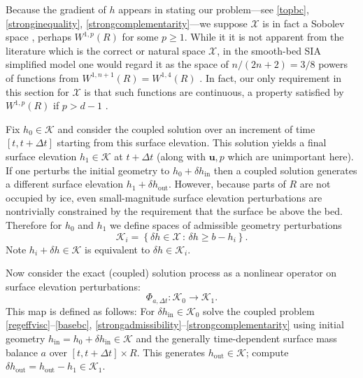 \documentclass[letterpaper,final,12pt,reqno]{amsart}
\newcommand{\bu}{\mathbf{u}}
\begin{document}
Because the gradient of $h$ appears in stating our problem---see \eqref{topbc}, \eqref{stronginequality}, \eqref{strongcomplementarity}---we suppose $\mathcal{X}$ is in fact a Sobolev space \cite{Evans2010}, perhaps $W^{1,p}(R)$ for some $p\ge 1$.  While it it is not apparent from the literature which is the correct or natural space $\mathcal{X}$, in the smooth-bed SIA simplified model one would regard it as the space of $n/(2n+2) = 3/8$ powers of functions from $W^{1,n+1}(R)=W^{1,4}(R)$ \cite{JouvetBueler2012}.  In fact, our only requirement in this section for $\mathcal{X}$ is that such functions are continuous, a property satisfied by $W^{1,p}(R)$ if $p>d-1$ \cite[theorem 5.6.5]{Evans2010}.

\newcommand{\hin}{h_{\text{in}}}
\newcommand{\hout}{h_{\text{out}}}

\newcommand{\dhin}{\delta h_{\text{in}}}
\newcommand{\dhout}{\delta h_{\text{out}}}

Fix $h_0 \in \mathcal{K}$ and consider the coupled solution over an increment of time $[t,t+\Delta t]$ starting from this surface elevation.  This solution yields a final surface elevation $h_1 \in \mathcal{K}$ at $t+\Delta t$ (along with $\bu,p$ which are unimportant here).  If one perturbs the initial geometry to $h_0+\dhin$ then a coupled solution generates a different surface elevation $h_1 + \dhout$.  However, because parts of $R$ are not occupied by ice, even small-magnitude surface elevation perturbations are nontrivially constrained by the requirement that the surface be above the bed.  Therefore for $h_0$ and $h_1$ we define spaces of admissible geometry perturbations
    $$\mathcal{K}_i = \left\{\delta h \in \mathcal{X} \,:\, \delta h \ge b - h_i\right\}.$$
Note $h_i+\delta h \in \mathcal{K}$ is equivalent to $\delta h \in \mathcal{K}_i$.

Now consider the exact (coupled) solution process as a nonlinear operator on surface elevation perturbations:
\begin{equation}
\Phi_{a,\Delta t} : \mathcal{K}_0 \to \mathcal{K}_1. \label{perturboperatorexact}
\end{equation}
This map is defined as follows: For $\dhin\in \mathcal{K}_0$ solve the coupled problem \eqref{regeffvisc}--\eqref{basebc}, \eqref{strongadmissibility}--\eqref{strongcomplementarity} using initial geometry $\hin=h_0+\dhin \in \mathcal{K}$ and the generally time-dependent surface mass balance $a$ over $[t,t+\Delta t]\times R$.  This generates $\hout \in \mathcal{K}$; compute $\dhout= \hout - h_1 \in \mathcal{K}_1$.
\end{document}
